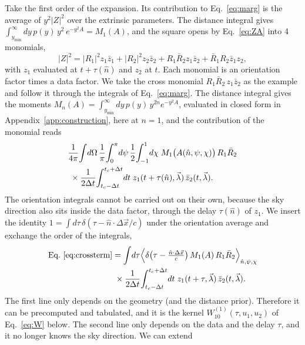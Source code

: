 \documentclass[aps,prd,twocolumn,superscriptaddress,nofootinbib]{revtex4-2}
\begin{document}
Take the first order of the expansion. Its contribution to
Eq.~\eqref{eq:marg} is the average of $y^2 |Z|^2$ over the extrinsic
parameters. The distance integral gives
$\int_{y_{\min}}^\infty dy\, p(y)\, y^2\, e^{-y^2 A} = M_1(A)$,
and the square opens by Eq.~\eqref{eq:ZA} into 4 monomials,
\begin{equation}
|Z|^2 = |R_1|^2 z_1 \bar z_1 + |R_2|^2 z_2 \bar z_2
+ R_1 \bar R_2 z_1 \bar z_2 + \bar R_1 R_2 \bar z_1 z_2,
\label{eq:binom1}
\end{equation}
with $z_1$ evaluated at $t + \tau(\hat n)$ and $z_2$ at $t$. Each
monomial is an orientation factor times a data factor. We take the
cross monomial $R_1 \bar R_2\, z_1 \bar z_2$ as the example and
follow it through the integrals of Eq.~\eqref{eq:marg}. The
distance integral gives the moments
$M_n(A) = \int_{y_{\min}}^\infty dy\, p(y)\, y^{2n} e^{-y^2 A}$,
evaluated in closed form in Appendix~\ref{app:construction}, here
at $n = 1$, and the contribution of the monomial reads
\begin{align}
&\frac{1}{4\pi}\!\int\! d\Omega\,
\frac{1}{\pi}\!\int_0^\pi\! d\psi\,
\frac{1}{2}\!\int_{-1}^{1}\! d\chi\;
M_1\big(A(\hat n, \psi, \chi)\big)\, R_1 \bar R_2\notag\\
&\;\times \frac{1}{2\Delta t}\!
\int_{t_c-\Delta t}^{t_c+\Delta t}\! dt\;
z_1(t + \tau(\hat n), \vec\lambda)\,
\bar z_2(t, \vec\lambda).
\label{eq:crossterm}
\end{align}
The orientation integrals cannot be carried out on their own,
because the sky direction also sits inside the data factor,
through the delay $\tau(\hat n)$ of $z_1$. We insert the
identity
$1 = \int d\tau\, \delta( \tau - \hat n \cdot \Delta \vec x / c )$
under the orientation average and exchange the order of the
integrals,
\begin{align}
\text{Eq.}~\eqref{eq:crossterm}
&= \int\! d\tau
\Big\langle \delta\big( \tau -
\tfrac{\hat n \cdot \Delta \vec x}{c} \big)\,
M_1(A)\, R_1 \bar R_2 \Big\rangle_{\hat n, \psi, \chi}
\notag\\
&\;\times \frac{1}{2\Delta t}\!
\int_{t_c-\Delta t}^{t_c+\Delta t}\! dt\;
z_1(t + \tau, \vec\lambda)\, \bar z_2(t, \vec\lambda).
\label{eq:split}
\end{align}
The first line only depends on the geometry (and the distance
prior). Therefore it can be precomputed and tabulated, and it is
the kernel $W^{(1)}_{10}(\tau, u_1, u_2)$ of Eq.~\eqref{eq:W}
below. The second line only depends on the data and the delay
$\tau$, and it no longer knows the sky direction. We can extend
\end{document}
